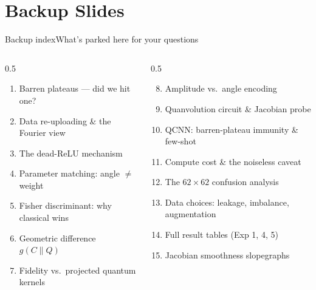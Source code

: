 \section{Backup Slides}

\begin{frame}{Backup index}{What's parked here for your questions}
    \begin{columns}[T]
        \begin{column}{0.5\textwidth}
            \footnotesize
            \begin{enumerate}
                \item Barren plateaus --- did we hit one?
                \item Data re-uploading \& the Fourier view
                \item The dead-ReLU mechanism
                \item Parameter matching: angle $\neq$ weight
                \item Fisher discriminant: why classical wins
                \item Geometric difference $g(C\|Q)$
                \item Fidelity vs.\ projected quantum kernels
            \end{enumerate}
        \end{column}
        \begin{column}{0.5\textwidth}
            \footnotesize
            \begin{enumerate}\setcounter{enumi}{7}
                \item Amplitude vs.\ angle encoding
                \item Quanvolution circuit \& Jacobian probe
                \item QCNN: barren-plateau immunity \& few-shot
                \item Compute cost \& the noiseless caveat
                \item The $62\times62$ confusion analysis
                \item Data choices: leakage, imbalance, augmentation
                \item Full result tables (Exp 1, 4, 5)
                \item Jacobian smoothness slopegraphs
            \end{enumerate}
        \end{column}
    \end{columns}
\end{frame}

